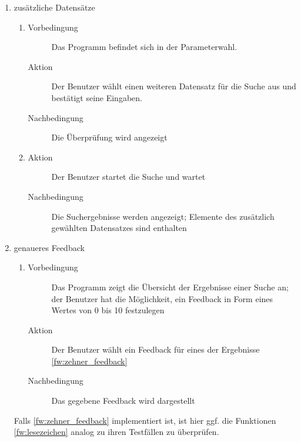 \begin{enumerate} [label=\bfseries /TSW \arabic*0/, leftmargin=*]
	\item zusätzliche Datensätze \label{ts:mehrere_datensaetze_waehlen}
	\begin{enumerate}[leftmargin=0pt]
		\item
		\begin{description}
			\item[Vorbedingung] Das Programm befindet sich in der Parameterwahl.
			\item[Aktion] Der Benutzer wählt einen weiteren Datensatz für die Suche aus und bestätigt seine Eingaben.
			\item[Nachbedingung] Die Überprüfung wird angezeigt
		\end{description}
		\item
		\begin{description}
			\item[Aktion] Der Benutzer startet die Suche und wartet
			\item[Nachbedingung] Die Suchergebnisse werden angezeigt; Elemente des zusätzlich gewählten Datensatzes sind enthalten
		\end{description}
	\end{enumerate}

	\item genaueres \gls{Feedback} \label{ts:zehner_feedback}
	\begin{enumerate}[leftmargin=0pt]
		\item
		\begin{description}
			\item[Vorbedingung] Das Programm zeigt die Übersicht der Ergebnisse einer Suche an; der Benutzer hat die Möglichkeit, ein \gls{Feedback} in Form eines Wertes von 0 bis 10 festzulegen
			\item[Aktion] Der Benutzer wählt ein \gls{Feedback} für eines der Ergebnisse \ref{fw:zehner_feedback}
			\item[Nachbedingung] Das gegebene \gls{Feedback} wird dargestellt
		\end{description}
	\end{enumerate}
	Falls \ref{fw:zehner_feedback} implementiert ist, ist hier ggf. die Funktionen \ref{fw:lesezeichen} analog zu ihren Testfällen zu überprüfen.
\end{enumerate}

